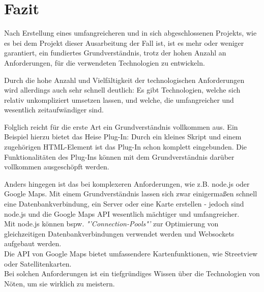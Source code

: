 \chapter{Fazit}
\label{Fazit}
Nach Erstellung eines umfangreicheren und in sich abgeschlossenen Projekts, wie es bei dem Projekt dieser Ausarbeitung der Fall ist, ist es mehr oder weniger garantiert, ein fundiertes Grundverständnis, trotz der hohen Anzahl an Anforderungen, für die verwendeten Technologien zu entwickeln. 
\par
Durch die hohe Anzahl und Vielfältigkeit der technologischen Anforderungen wird allerdings auch sehr schnell deutlich: Es gibt Technologien, welche sich relativ unkompliziert umsetzen lassen, und welche, die umfangreicher und wesentlich zeitaufwändiger sind. 
\par
Folglich reicht für die erste Art ein Grundverständnis vollkommen aus. Ein Beispiel hierzu bietet das Heise Plug-In: Durch ein kleines Skript und einem zugehörigen HTML-Element ist das Plug-In schon komplett eingebunden. Die Funktionalitäten des Plug-Ins können mit dem Grundverständnis darüber vollkommen ausgeschöpft werden.
\par
Anders hingegen ist das bei komplexeren Anforderungen, wie z.B. node.js oder Google Maps. Mit einem Grundverständnis lassen sich zwar einigermaßen schnell eine Datenbankverbindung, ein Server oder eine Karte erstellen - jedoch sind node.js und die Google Maps API wesentlich mächtiger und umfangreicher. 
\\
Mit node.js können bspw. \textit{"'Connection-Pools"'} zur Optimierung von gleichzeitigen Datenbankverbindungen verwendet werden und Websockets aufgebaut werden. 
\\
Die API von Google Maps bietet umfassendere Kartenfunktionen, wie Streetview oder Satellitenkarten.
\\
Bei solchen Anforderungen ist ein tiefgründiges Wissen über die Technologien von Nöten, um sie wirklich zu meistern.
